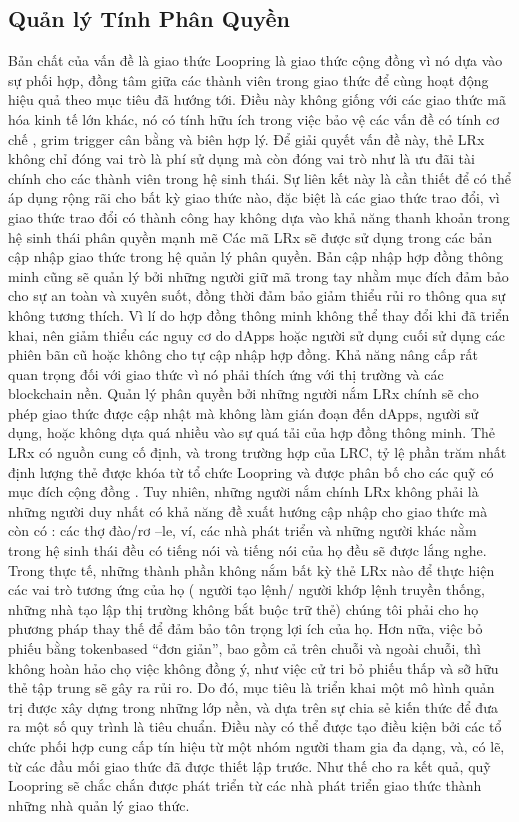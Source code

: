 \documentclass{article}
\begin{document}
\begin{multicols}{2}
\subsection{Quản lý Tính Phân Quyền}
Bản chất của vấn đề là giao thức Loopring là giao thức cộng đồng vì nó dựa vào sự phối hợp, đồng tâm giữa các thành viên trong giao thức để cùng hoạt động hiệu quả theo mục tiêu đã hướng tới. Điều này không giống với các giao thức mã hóa kinh tế lớn khác, nó có tính hữu ích trong việc bảo vệ các vấn đề có tính cơ chế \cite{vitalikgovernance}, grim trigger cân bằng và biên hợp lý. Để giải quyết vấn đề này, thẻ LRx không chỉ đóng vai trò là phí sử dụng mà còn đóng vai trò như là ưu đãi tài chính cho các thành viên trong hệ sinh thái. Sự liên kết này là cần thiết để có thể áp dụng rộng rãi cho bất kỳ giao thức nào, đặc biệt là các giao thức trao đổi, vì giao thức trao đổi có thành công hay không dựa vào khả năng thanh khoản trong hệ sinh thái phân quyền mạnh mẽ
Các mã LRx sẽ được sử dụng trong các bản cập nhập giao thức trong hệ quản lý phân quyền. Bản cập nhập hợp đồng thông minh cũng sẽ quản lý bởi những người giữ mã trong tay nhằm mục đích đảm bảo cho sự an toàn và xuyên suốt, đồng thời đảm bảo giảm thiểu rủi ro thông qua sự không tương thích. Vì lí do hợp đồng thông minh không thể thay đổi khi đã triển khai, nên giảm thiểu các nguy cơ do dApps hoặc người sử dụng cuối sử dụng các phiên bãn cũ hoặc không cho tự cập nhập hợp đồng. Khả năng nâng cấp rất quan trọng đối với giao thức vì nó phải thích ứng với thị trường và các blockchain nền. Quản lý phân quyền bởi những người nắm LRx chính sẽ cho phép giao thức được cập nhật mà không làm gián đoạn đến dApps, người sử dụng, hoặc không dựa quá nhiều vào sự quá tải của hợp đồng thông minh. Thẻ LRx có nguồn cung cố định, và trong trường hợp của LRC, tỷ lệ phần trăm nhất định lượng thẻ được khóa từ tổ chức Loopring và được phân bố cho các quỹ có mục đích cộng đồng \cite{LRCtokendoc}.
Tuy nhiên, những người nắm chính LRx không phải là những người duy nhất có khả năng đề xuất hướng cập nhập cho giao thức mà còn có : các thợ đào/rơ –le, ví, các nhà phát triển và những người khác nằm trong hệ sinh thái đều có tiếng nói và tiếng nói của họ đều sẽ được lắng nghe. Trong thực tế, những thành phần không nắm bất kỳ thẻ LRx nào để thực hiện các vai trò tương ứng của họ ( người tạo lệnh/ người khớp lệnh truyền thống, những nhà tạo lập thị trường không bắt buộc trữ thẻ) chúng tôi phải cho họ phương pháp thay thế để đảm bảo tôn trọng lợi ích của họ. Hơn nữa, việc bỏ phiếu bằng tokenbased “đơn giản”, bao gồm cả trên chuỗi và ngoài chuỗi, thì không hoàn hảo chọ việc không đồng ý, như việc cử tri bỏ phiếu thấp và sỡ hữu thẻ tập trung sẽ gây ra rủi ro. Do đó, mục tiêu là triển khai một mô hình quản trị được xây dựng trong những lớp nền, và dựa trên sự chia sẻ kiến thức để đưa ra một số quy trình là tiêu chuẩn. Điều này có thể được tạo điều kiện bởi các tổ chức phối hợp cung cấp tín hiệu từ một nhóm người tham gia đa dạng, và, có lẽ, từ các đầu mối giao thức đã được thiết lập trước. Như thế cho ra kết quả, quỹ Loopring sẽ chắc chắn được phát triển từ các nhà phát triển giao thức thành những nhà quản lý giao thức.

\end{multicols}
\end{document}
